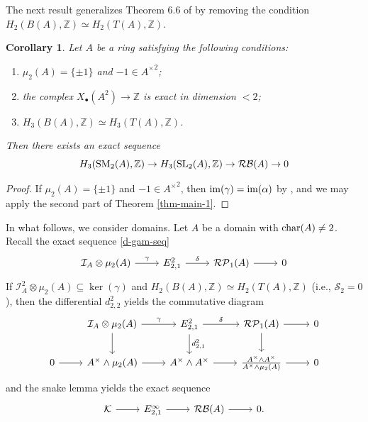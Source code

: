 \documentclass[11pt]{amsart}
\theoremstyle{definition}
\theoremstyle{plain}
\newtheorem{cor}[ntn]{Corollary}
\numberwithin{equation}{section}
\newcommand{\z}{\mathbb{Z}}
\newcommand{\II}{\mathcal{I}}
\newcommand{\RP}{\mathcal{RP}}
\newcommand{\RB}{\mathcal{RB}}
\renewcommand{\SS}{\mathcal{S}}
\renewcommand{\aa}{{A^\times}}
\newcommand{\SL}{\mathit{{\rm SL}}}
\newcommand{\SM}{\mathit{{\rm SM}}}
\newcommand{\im}{{\rm im}}
\renewcommand{\char}{{\rm char}}
\begin{document}
The next result generalizes Theorem 6.6 of \cite{B-E--2023} by removing the condition $H_2(B(A),\z)\simeq H_2(T(A),\z)$. 
\begin{cor}
    \label{thm-main-ant}
    Let $A$ be a ring satisfying the following conditions:
    \begin{enumerate}
        \item $\mu_2(A)=\{\pm 1\}$ and $-1\in\aa^2$;
        \item the complex $X_\bullet(A^2)\to\z$ is exact in dimension $<2$;
        \item $H_3(B(A),\z)\simeq H_3(T(A),\z)$.
    \end{enumerate}
    Then there exists an exact sequence
    \[
        H_3(\SM_2(A),\z)\to H_3(\SL_2(A),\z)\to \RB(A)\to 0
    \]
\end{cor}
\begin{proof}
    If $\mu_2(A)=\{\pm 1\}$ and $-1\in\aa^2$, then $\im(\gamma)=\im(\alpha)$ by \cite[Corollary 6.4]{B-E--2023}, and we may apply the second part of Theorem \ref{thm-main-1}.
\end{proof}
In what follows, we consider domains. Let $A$ be a domain with $\char(A)\neq 2$. Recall the exact sequence \ref{d-gam-seq}
\[
    \begin{tikzcd}
        \II_A\otimes\mu_2(A)\ar[r,"\gamma"] & E^2_{2,1}\ar[r,"\delta"] & \RP_1(A) \ar[r] & 0
    \end{tikzcd}
\]
If $\II_A^2\otimes\mu_2(A)\subseteq\ker(\gamma)$ and $H_2(B(A),\z)\simeq H_2(T(A),\z)$ (i.e., $\SS_2=0$), then the differential $d^2_{2,2}$ yields the commutative diagram
\[
    \begin{tikzcd}
        &\II_A\otimes\mu_2(A)\ar[r,"\gamma"]\ar[d] & E^2_{2,1}\ar[r,"\delta"]\ar[d,"d^2_{2,1}"] & \RP_1(A) \ar[r]\ar[d] & 0\\
        0 \ar[r] & \aa\wedge\mu_2(A) \ar[r]& \aa\wedge\aa \ar[r] & \frac{\aa\wedge\aa}{\aa\wedge\mu_2(A)} \ar[r] & 0
    \end{tikzcd}
\]
and the snake lemma yields the exact sequence
\[
    \begin{tikzcd}
        \mathcal{K}\ar[r] & E^{\infty}_{2,1}\ar[r] & \RB(A)\ar[r] & 0.
    \end{tikzcd}
\]
\end{document}
